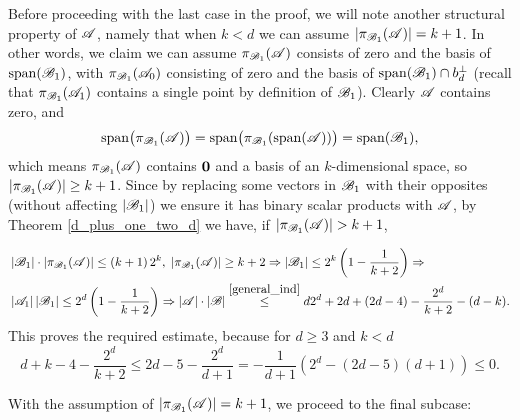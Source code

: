         \noindent Before proceeding with the last case in the proof, we will note another structural property of ${\mathscr{A}}$, namely that when $k < d$ we can assume $|\pi_{{\mathscr{B}}_1}({\mathscr{A}})|=k+1$. In other words, we claim we can assume $\pi_{{\mathscr{B}}_1}({\mathscr{A}})$ consists of zero and the basis of $\operatorname{span}({\mathscr{B}}_1)$, with $\pi_{{\mathscr{B}}_1}({\mathscr{A}}_0)$ consisting of zero and the basis of $\operatorname{span}({\mathscr{B}}_1) \cap b_d^{\bot}$ (recall that $\pi_{{\mathscr{B}}_1}({\mathscr{A}}_1)$ contains a single point by definition of ${\mathscr{B}}_1$). 
        Clearly ${\mathscr{A}}$ contains zero, and
        \[
            \operatorname{span}\bigl(\pi_{{\mathscr{B}}_1}({\mathscr{A}})\bigr)=\operatorname{span}\bigl(\pi_{{\mathscr{B}}_1}(\operatorname{span}({\mathscr{A}}))\bigr)=\operatorname{span}({\mathscr{B}}_1),
        \]
        which means $\pi_{{\mathscr{B}}_1}({\mathscr{A}})$ contains $\mathbf{0}$ and a basis of an $k$-dimensional space, so $|\pi_{{\mathscr{B}}_1}({\mathscr{A}})|\geq k+1$. Since by replacing some vectors in ${\mathscr{B}}_1$ with their opposites (without affecting $|{\mathscr{B}}_1|$) we ensure it has binary scalar products with ${\mathscr{A}}$, by Theorem \ref{d_plus_one_two_d} we have, if $\left|\pi_{{\mathscr{B}}_1}({\mathscr{A}})\right| > k+1$,
        
        \begin{align}
            & \left|{\mathscr{B}}_1\right|\cdot\left|\pi_{{\mathscr{B}}_1}({\mathscr{A}})\right|\leq\left(k+1\right)2^k,\;\left|\pi_{{\mathscr{B}}_1}({\mathscr{A}})\right|\geq k+2 \Rightarrow \left|{\mathscr{B}}_1\right| \leq 2^k\left(1-\frac{1}{k+2}\right) \Rightarrow \nonumber \\
            & \left|{\mathscr{A}}_1\right|\left|{\mathscr{B}}_1\right| \leq 2^d\left(1-\frac{1}{k+2}\right) \Rightarrow \left|{\mathscr{A}}\right|\cdot\left|{\mathscr{B}}\right|\stackrel{\eqref{general_ind}}{\leq} d 2^d + 2d + (2d-4)- \frac{2^d}{k+2}-(d-k). \nonumber
        \end{align}
        This proves the required estimate, because for $d \geq 3$ and $k < d$
        \begin{equation*}
            d+k-4-\frac{2^d}{k+2}\leq2d-5-\frac{2^d}{d+1}=-\frac{1}{d+1}\left(2^d - (2d-5)(d+1)\right)\leq 0.
        \end{equation*}

        \noindent With the assumption of $|\pi_{{\mathscr{B}}_1}({\mathscr{A}})|=k+1$, we proceed to the final subcase:
        
